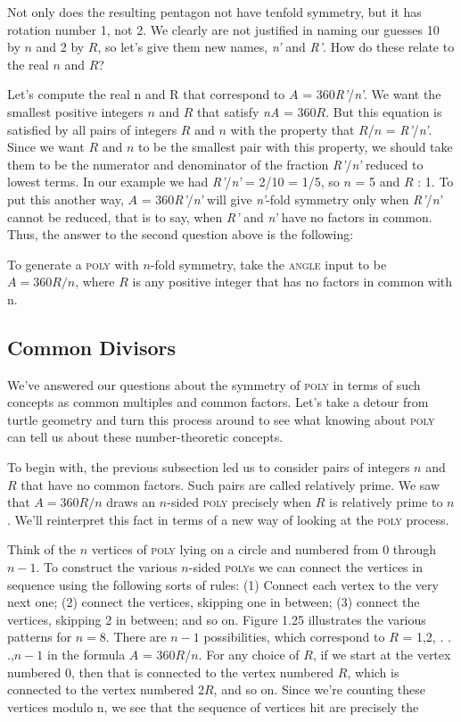 \documentclass{book}
\begin{document}
Not only does the resulting pentagon not have tenfold symmetry, but it
has rotation number 1, not 2. We clearly are not justified in naming our
guesses 10 by $n$ and 2 by $R$, so let's give them new names, {\em n'} and {\em R'}.
How do these relate to the real $n$ and $R$?

Let's compute the real n and R that correspond to $A$ = 360{\em R'}/{\em n'}. We
want the smallest positive integers $n$ and $R$ that satisfy {\em nA} = 360$R$. But
this equation is satisfied by all pairs of integers $R$ and $n$ with the property
that $R$/$n$ = {\em R'}/{\em n'}. Since we want $R$ and $n$ to be the smallest pair with
this property, we should take them to be the numerator and denominator
of the fraction {\em R'}/{\em n'} reduced to lowest terms. In our example we had
{\em R'}/{\em n'} = 2/10 = 1/5, so $n$ = 5 and $R$ : 1. To put this another way,
$A$ = 360{\em R'}/{\em n'} will give {\em n'}-fold symmetry only when {\em R'}/{\em n'} cannot be
reduced, that is to say, when {\em R'} and {\em n'} have no factors in common.
Thus, the answer to the second question above is the following:

To generate a \textsc{poly} with $n$-fold symmetry, take the \textsc{angle} input to be
$A = 360R/n$, where $R$ is any positive integer that has no factors in
common with n.

\subsection{Common Divisors}

We've answered our questions about the symmetry of \textsc{poly} in terms of
such concepts as common multiples and common factors. Let's take a
detour from turtle geometry and turn this process around to see what
knowing about \textsc{poly} can tell us about these number-theoretic concepts.

To begin with, the previous subsection led us to consider pairs of
integers $n$ and $R$ that have no common factors. Such pairs are called
relatively prime. We saw that $A = 360R/n$ draws an $n$-sided \textsc{poly}
precisely when $R$ is relatively prime to $n$. We'll reinterpret this fact in
terms of a new way of looking at the \textsc{poly} process.

Think of the $n$ vertices of \textsc{poly} lying on a circle and numbered from 0
through $n - 1$. To construct the various $n$-sided \textsc{poly}s we can connect
the vertices in sequence using the following sorts of rules: (1) Connect
each vertex to the very next one; (2) connect the vertices, skipping one
in between; (3) connect the vertices, skipping 2 in between; and so on.
Figure 1.25 illustrates the various patterns for $n = 8$. There are $n - 1$
possibilities, which correspond to $R$ = 1,2, . . .,$n - 1$ in the formula
$A$ = 360$R$/$n$. For any choice of $R$, if we start at the vertex numbered
0, then that is connected to the vertex numbered $R$, which is connected
to the vertex numbered 2$R$, and so on. Since we're counting these vertices modulo n, we see that the sequence of vertices hit are precisely the
\end{document}
